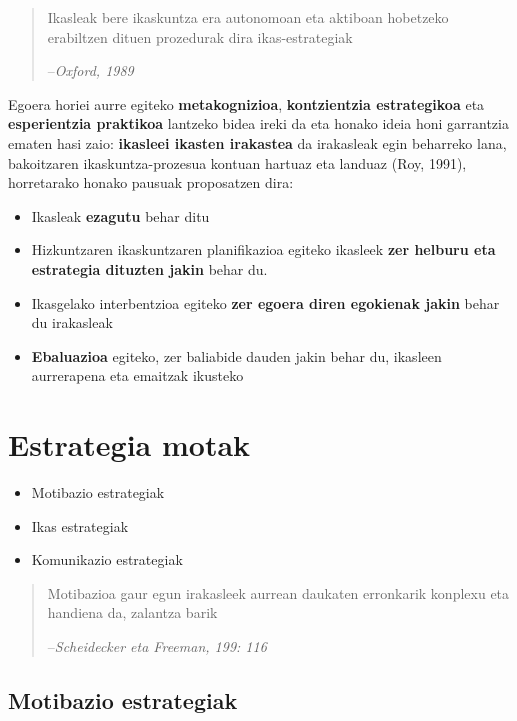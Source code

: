 \documentclass[
]{book}
\providecommand{\tightlist}{%
  \setlength{\itemsep}{0pt}\setlength{\parskip}{0pt}}
\begin{document}
\begin{quote}
Ikasleak bere ikaskuntza era autonomoan eta aktiboan hobetzeko erabiltzen dituen prozedurak dira ikas-estrategiak

--\emph{Oxford, 1989}
\end{quote}

Egoera horiei aurre egiteko \textbf{metakognizioa}, \textbf{kontzientzia estrategikoa} eta \textbf{esperientzia praktikoa} lantzeko bidea ireki da eta honako ideia honi garrantzia ematen hasi zaio: \textbf{ikasleei ikasten irakastea} da irakasleak egin beharreko lana, bakoitzaren ikaskuntza-prozesua kontuan hartuaz eta landuaz (Roy, 1991), horretarako honako pausuak proposatzen dira:

\begin{itemize}
\tightlist
\item
  Ikasleak \textbf{ezagutu} behar ditu
\item
  Hizkuntzaren ikaskuntzaren planifikazioa egiteko ikasleek \textbf{zer helburu eta estrategia dituzten jakin} behar du.
\item
  Ikasgelako interbentzioa egiteko \textbf{zer egoera diren egokienak jakin} behar du irakasleak
\item
  \textbf{Ebaluazioa} egiteko, zer baliabide dauden jakin behar du, ikasleen aurrerapena eta emaitzak ikusteko
\end{itemize}

\hypertarget{estrategia-motak}{%
\section{Estrategia motak}\label{estrategia-motak}}

\begin{itemize}
\tightlist
\item
  Motibazio estrategiak
\item
  Ikas estrategiak
\item
  Komunikazio estrategiak
\end{itemize}

\begin{quote}
Motibazioa gaur egun irakasleek aurrean daukaten erronkarik konplexu eta handiena da, zalantza barik

--\emph{Scheidecker eta Freeman, 199: 116}
\end{quote}

\hypertarget{motibazio-estrategiak}{%
\subsection{Motibazio estrategiak}\label{motibazio-estrategiak}}
\end{document}
